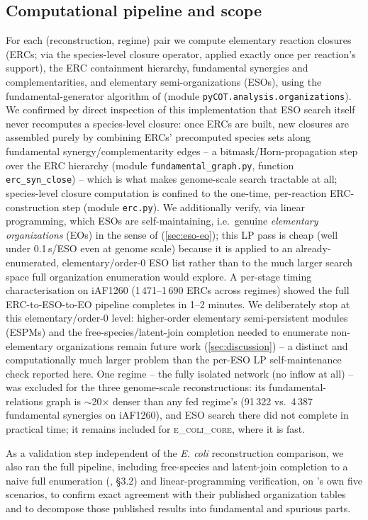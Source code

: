 \documentclass[nocrop]{bioinfo}
\begin{document}
\subsection{Computational pipeline and scope}
\label{sec:pipeline-scope}
For each (reconstruction, regime) pair we compute elementary reaction closures (ERCs; via the
species-level closure operator, applied exactly once per reaction's support), the ERC
containment hierarchy, fundamental synergies and complementarities, and elementary
semi-organizations (ESOs), using the fundamental-generator algorithm of \citet{velozbassi}
(module \texttt{pyCOT.analysis.organizations}). We confirmed by direct inspection of this
implementation that ESO search itself never recomputes a species-level closure: once ERCs are
built, new closures are assembled purely by combining ERCs' precomputed species sets along
fundamental synergy/complementarity edges -- a bitmask/Horn-propagation step over the ERC
hierarchy (module \texttt{fundamental\_graph.py}, function \texttt{erc\_syn\_close}) -- which is
what makes genome-scale search tractable at all; species-level closure computation is confined
to the one-time, per-reaction ERC-construction step (module \texttt{erc.py}). We additionally
verify, via linear programming, which ESOs are self-maintaining, i.e.\ genuine \emph{elementary
organizations} (EOs) in the sense of \citet{centler2008computing} (\cref{sec:eso-eo}); this LP
pass is cheap (well under 0.1\,s/ESO even at genome scale) because it is applied to an
already-enumerated, elementary/order-0 ESO list rather than to the much larger search space full
organization enumeration would explore. A per-stage timing characterisation on iAF1260
(1\,471--1\,690 ERCs across regimes) showed the full ERC-to-ESO-to-EO pipeline completes in 1--2
minutes. We deliberately stop at this elementary/order-0 level: higher-order elementary
semi-persistent modules (ESPMs) and the free-species/latent-join completion needed to enumerate
non-elementary organizations remain future work (\cref{sec:discussion}) -- a distinct and
computationally much larger problem than the per-ESO LP self-maintenance check reported here.
One regime -- the fully isolated network (no inflow at all) --
was excluded for the three genome-scale reconstructions: its fundamental-relations graph is
$\sim$20$\times$ denser than any fed regime's (91\,322 vs.\ 4\,387 fundamental synergies on
iAF1260), and ESO search there did not complete in practical time; it remains included for
\textsc{e\_coli\_core}, where it is fast.

As a validation step independent of the \textit{E. coli} reconstruction comparison, we also ran
the full pipeline, including free-species and latent-join completion to a naive full
enumeration (\citealp{velozbassi}, \S3.2) and linear-programming verification, on
\citeauthor{centler2006}'s own five scenarios, to confirm exact agreement with their published
organization tables and to decompose those published results into fundamental and spurious
parts.
\end{document}
